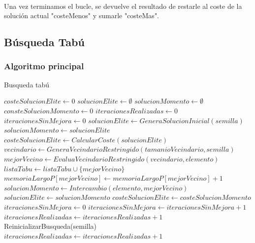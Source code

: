 \documentclass{article}
\begin{document}
	\paragraph{}Una vez terminamos el bucle, se devuelve el resultado de restarle al coste de la solución actual "costeMenos" y sumarle "costeMas".
	
	\subsection{Búsqueda Tabú}
	
	\subsubsection{Algoritmo principal}
	
	\begin{algorithm}[H]
		\caption{Busqueda tabú}
		\begin{algorithmic}
			\STATE $costeSolucionElite \leftarrow 0$
			\STATE $solucionElite \leftarrow \emptyset$
			\STATE $solucionMomento \leftarrow \emptyset$
			\STATE $consteSolucionMomento \leftarrow 0$
			\STATE $iteracionesRealizadas \leftarrow 0$
			\STATE $iteracionesSinMejora \leftarrow 0$
			\STATE $solucionElite \leftarrow GeneraSolucionInicial(semilla)$
			\STATE $solucionMomento \leftarrow solucionElite$
			\STATE $costeSolucionElite \leftarrow CalcularCoste(solucionElite)$
			\STATE $vecindario \leftarrow GeneraVecindarioRestringido(tamanioVecindario,semilla)$
			\STATE $mejorVecino \leftarrow EvaluaVecindarioRestringido(vecindario,elemento)$
			\ENDFOR
			\STATE $listaTabu \leftarrow listaTabu \cup \{mejorVecino\}$
			\STATE $memoriaLargoP[mejorVecino] \leftarrow memoriaLargoP[mejorVecino]+1$
			\STATE $solucionMomento \leftarrow Intercambio(elemento, mejorVecino)$
			\STATE $solucionElite \leftarrow solucionMomento$
			\STATE $costeSolucionElite \leftarrow costeSolucionMomento$
			\STATE $iteracionesSinMejora \leftarrow 0$
			\ELSE
			\STATE $iteracionesSinMejora \leftarrow iteracionesSinMejora+1$
			\ENDIF
			\STATE $iteracionesRealizadas \leftarrow iteracionesRealizadas+1$
			\STATE ReinicializarBusqueda(semilla)
			\STATE $iteracionesRealizadas \leftarrow iteracionesRealizadas+1$
			\ENDIF
			\ENDWHILE
		\end{algorithmic}
	\end{algorithm}
	
\end{document}
